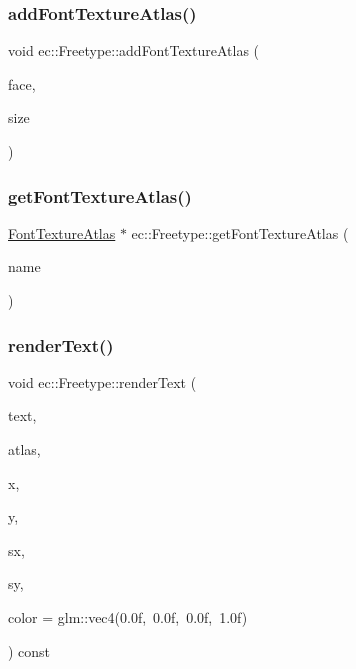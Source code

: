 \mbox{\label{classec_1_1_freetype_a1be4b69e2d57689533ddaabdc9042d51}} 
\subsubsection{\texorpdfstring{add\+Font\+Texture\+Atlas()}{addFontTextureAtlas()}}
{\footnotesize\ttfamily void ec\+::\+Freetype\+::add\+Font\+Texture\+Atlas (\begin{DoxyParamCaption}\item[{const std\+::string \&}]{face,  }\item[{unsigned int}]{size }\end{DoxyParamCaption})}

\mbox{\label{classec_1_1_freetype_a3e0a8937ec0ceb33495598da59b2c4f3}} 
\subsubsection{\texorpdfstring{get\+Font\+Texture\+Atlas()}{getFontTextureAtlas()}}
{\footnotesize\ttfamily \mbox{\hyperlink{classec_1_1_font_texture_atlas}{Font\+Texture\+Atlas}} $\ast$ ec\+::\+Freetype\+::get\+Font\+Texture\+Atlas (\begin{DoxyParamCaption}\item[{const std\+::string \&}]{name }\end{DoxyParamCaption})}

\mbox{\label{classec_1_1_freetype_afef1f61fa4bd8114825c66ac93d3e6bf}} 
\subsubsection{\texorpdfstring{render\+Text()}{renderText()}}
{\footnotesize\ttfamily void ec\+::\+Freetype\+::render\+Text (\begin{DoxyParamCaption}\item[{const char $\ast$}]{text,  }\item[{\mbox{\hyperlink{classec_1_1_font_texture_atlas}{Font\+Texture\+Atlas}} $\ast$}]{atlas,  }\item[{float}]{x,  }\item[{float}]{y,  }\item[{float}]{sx,  }\item[{float}]{sy,  }\item[{const glm\+::vec4 \&}]{color = {\ttfamily glm\+:\+:vec4(0.0f,~0.0f,~0.0f,~1.0f)} }\end{DoxyParamCaption}) const}



